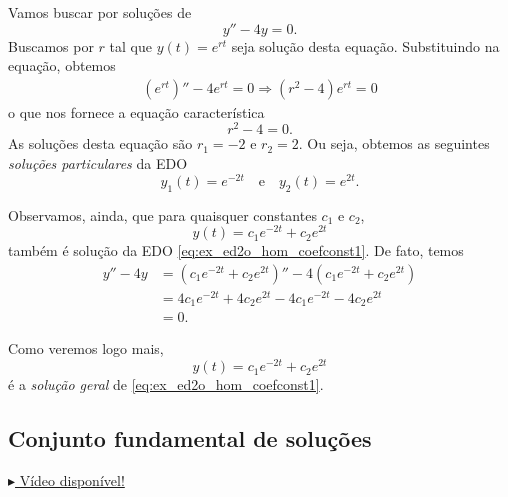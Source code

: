 \begin{ex}\label{ex:ed2o_homcc}
  Vamos buscar por soluções de
  \begin{equation}\label{eq:ex_ed2o_hom_coefconst1}
    y'' - 4y = 0.
  \end{equation}
  Buscamos por $r$ tal que $y(t) = e^{rt}$ seja solução desta equação. Substituindo na equação, obtemos
  \begin{align}
    \left(e^{rt}\right)'' - 4e^{rt} = 0 \Rightarrow (r^2 - 4)e^{rt} = 0
  \end{align}
  o que nos fornece a equação característica
  \begin{equation}
    r^2 - 4 = 0.
  \end{equation}
  As soluções desta equação são $r_1 = -2$ e $r_2 = 2$. Ou seja, obtemos as seguintes \emph{soluções particulares} da EDO
  \begin{equation}
    y_1(t) = e^{-2t}\quad\text{e}\quad y_2(t) = e^{2t}.
  \end{equation}

  Observamos, ainda, que para quaisquer constantes $c_1$ e $c_2$,
  \begin{equation}
    y(t) = c_1e^{-2t} + c_2e^{2t}
  \end{equation}
  também é solução da EDO \eqref{eq:ex_ed2o_hom_coefconst1}. De fato, temos
  \begin{align}
    y'' - 4y &= \left(c_1e^{-2t} + c_2e^{2t}\right)'' -4\left(c_1e^{-2t}+c_2e^{2t}\right) \\
             &= 4c_1e^{-2t} + 4c_2e^{2t} -4c_1e^{-2t} -4c_2e^{2t} \\
             &= 0.
  \end{align}

  Como veremos logo mais,
  \begin{equation}
    y(t) = c_1e^{-2t} + c_2e^{2t}
  \end{equation}
  é a \emph{solução geral} de \eqref{eq:ex_ed2o_hom_coefconst1}.
\end{ex}

\subsection{Conjunto fundamental de soluções}

\begin{flushright}
  \href{https://archive.org/details/wronskiano-edo-de-ordem-2}{$\blacktriangleright$ Vídeo disponível!}
\end{flushright}

